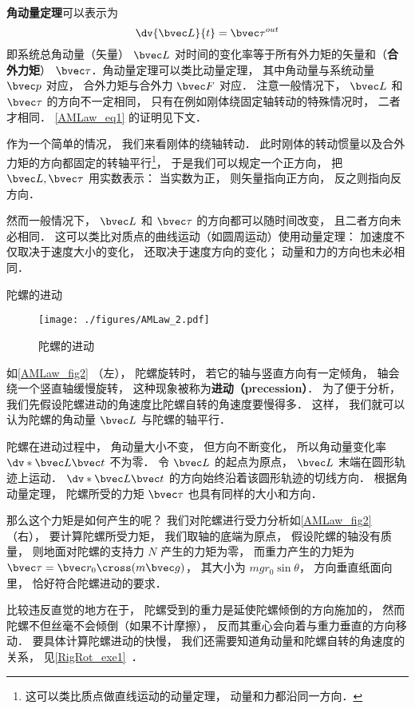 
\textbf{角动量定理}可以表示为
\begin{equation}\label{AMLaw_eq1}
\dv{\bvec L}{t} = \bvec \tau^{out}
\end{equation}
即系统总角动量（矢量） $\bvec L$ 对时间的变化率等于所有外力矩的矢量和（\textbf{合外力矩}） $\bvec \tau$．角动量定理可以类比动量定理， 其中角动量与系统动量 $\bvec p$ 对应， 合外力矩与合外力 $\bvec F$ 对应． 注意一般情况下， $\bvec L$ 和 $\bvec \tau$ 的方向不一定相同， 只有在例如刚体绕固定轴转动的特殊情况时， 二者才相同． \autoref{AMLaw_eq1} 的证明见下文．

作为一个简单的情况， 我们来看刚体的绕轴转动． 此时刚体的转动惯量以及合外力矩的方向都固定的转轴平行\footnote{这可以类比质点做直线运动的动量定理， 动量和力都沿同一方向．}， 于是我们可以规定一个正方向， 把 $\bvec L, \bvec \tau$ 用实数表示： 当实数为正， 则矢量指向正方向， 反之则指向反方向．

然而一般情况下， $\bvec L$ 和 $\bvec \tau$ 的方向都可以随时间改变， 且二者方向未必相同． 这可以类比对质点的曲线运动（如圆周运动）使用动量定理： 加速度不仅取决于速度大小的变化， 还取决于速度方向的变化； 动量和力的方向也未必相同．
\begin{example}{陀螺的进动}\label{AMLaw_ex2}
\begin{figure}[ht]
\centering
\texttt{[image: ./figures/AMLaw\_2.pdf]}
\caption{陀螺的进动}\label{AMLaw_fig2}
\end{figure}

如\autoref{AMLaw_fig2} （左）， 陀螺旋转时， 若它的轴与竖直方向有一定倾角， 轴会绕一个竖直轴缓慢旋转， 这种现象被称为\textbf{进动（precession）}． 为了便于分析， 我们先假设陀螺进动的角速度比陀螺自转的角速度要慢得多． 这样， 我们就可以认为陀螺的角动量 $\bvec L$ 与陀螺的轴平行．

陀螺在进动过程中， 角动量大小不变， 但方向不断变化， 所以角动量变化率 $\dv*{\bvec L}{\bvec t}$ 不为零． 令 $\bvec L$ 的起点为原点， $\bvec L$ 末端在圆形轨迹上运动． $\dv*{\bvec L}{\bvec t}$ 的方向始终沿着该圆形轨迹的切线方向． 根据角动量定理， 陀螺所受的力矩 $\bvec \tau$ 也具有同样的大小和方向．

那么这个力矩是如何产生的呢？ 我们对陀螺进行受力分析如\autoref{AMLaw_fig2} （右）， 要计算陀螺所受力矩， 我们取轴的底端为原点， 假设陀螺的轴没有质量， 则地面对陀螺的支持力 $N$ 产生的力矩为零， 而重力产生的力矩为 $\bvec \tau = \bvec r_0 \cross (m\bvec g)$， 其大小为 $mgr_0\sin\theta$， 方向垂直纸面向里， 恰好符合陀螺进动的要求．

比较违反直觉的地方在于， 陀螺受到的重力是延使陀螺倾倒的方向施加的， 然而陀螺不但丝毫不会倾倒（如果不计摩擦）， 反而其重心会向着与重力垂直的方向移动． 要具体计算陀螺进动的快慢， 我们还需要知道角动量和陀螺自转的角速度的关系， 见\autoref{RigRot_exe1}~．
\end{example}

